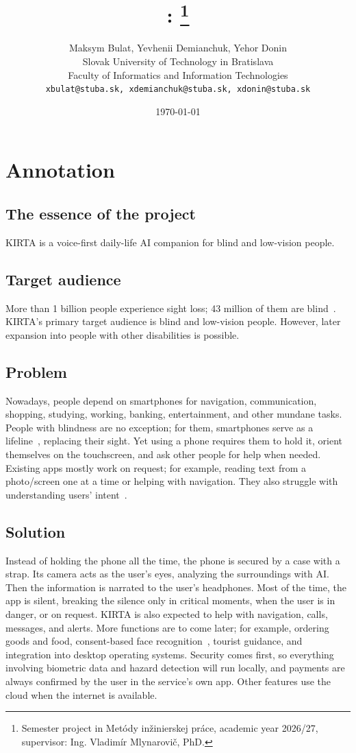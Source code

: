 \documentclass[10pt,twoside,english,a4paper]{article}
\title{\projacronym: \projtitle\thanks{Semester project in Metódy inžinierskej práce, academic year 2026/27, supervisor: Ing. Vladimír Mlynarovič, PhD.}}
\author{Maksym Bulat, Yevhenii Demianchuk, Yehor Donin\\[2pt]
	{\small Slovak University of Technology in Bratislava}\\
	{\small Faculty of Informatics and Information Technologies}\\
	{\small \texttt{xbulat@stuba.sk, xdemianchuk@stuba.sk, xdonin@stuba.sk}}
	}
\date{\small \today}
\newcommand{\projacronym}{KIRTA}
\begin{document}
\maketitle

\section*{Annotation}

\subsection*{The essence of the project}

\projacronym{} is a voice-first daily-life AI companion for blind and low-vision people.

\subsection*{Target audience}

More than 1 billion people experience sight loss; 43 million of them are blind~\cite{iapb}. \projacronym's primary target audience is blind and low-vision people. However, later expansion into people with other disabilities is possible.

\subsection*{Problem}

Nowadays, people depend on smartphones for navigation, communication, shopping, studying, working, banking, entertainment, and other mundane tasks. People with blindness are no exception; for them, smartphones serve as a lifeline~\cite{senjam2022}, replacing their sight. Yet using a phone requires them to hold it, orient themselves on the touchscreen, and ask other people for help when needed. Existing apps mostly work on request; for example, reading text from a photo/screen one at a time or helping with navigation. They also struggle with understanding users' intent~\cite{xie2025}.

\subsection*{Solution}

Instead of holding the phone all the time, the phone is secured by a case with a strap. Its camera acts as the user's eyes, analyzing the surroundings with AI. Then the information is narrated to the user's headphones. Most of the time, the app is silent, breaking the silence only in critical moments, when the user is in danger, or on request. \projacronym{} is also expected to help with navigation, calls, messages, and alerts. More functions are to come later; for example, ordering goods and food, consent-based face recognition~\cite{gdpr, aiact, akter2022}, tourist guidance, and integration into desktop operating systems. Security comes first, so everything involving biometric data and hazard detection will run locally, and payments are always confirmed by the user in the service's own app. Other features use the cloud when the internet is available.
\end{document}
